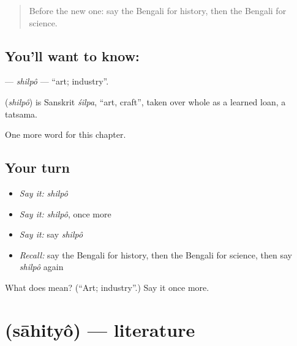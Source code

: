 \label{lesson:BN-C256-shilpo}



\begin{quote}
Before the new one: say the Bengali for history, then the Bengali for science.
\end{quote}

\subsection*{You'll want to know: }
\textbf{} — \emph{shilpô} — \textquotedblleft{}art; industry\textquotedblright{}.

\begin{cousinweb}
\textbf{} (\emph{shilpô}) is Sanskrit \emph{śilpa}, \textquotedblleft{}art, craft\textquotedblright{}, taken over whole as a learned loan, a tatsama.
\end{cousinweb}

\begin{grammarlens}[title={What you've built}]
One more word for this chapter.
\end{grammarlens}

\subsection*{Your turn}
\begin{itemize}
\raggedright
  \item \emph{Say it:} \emph{shilpô}
  \item \emph{Say it:} \emph{shilpô}, once more
  \item \emph{Say it:} say \emph{shilpô}
  \item \emph{Recall:} say the Bengali for history, then the Bengali for science, then say \emph{shilpô} again
\end{itemize}

\begin{tcolorbox}[breakable,colback=teal!4,colframe=teal!35!black,title={Before you move on}]
What does  mean? (\textquotedblleft{}Art; industry\textquotedblright{}.) Say it once more.
\end{tcolorbox}
\section[\texorpdfstring{\bn{সাহিত্য} (sāhityô)}{সাহিত্য (sāhityô)}]{ (sāhityô) — literature}

\label{lesson:BN-C256-sahityo}



